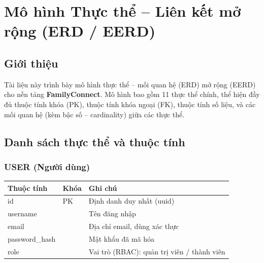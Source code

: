 \section{Mô hình Thực thể -- Liên kết mở rộng (ERD / EERD)}
\label{sec:1_3_mo_hinh_erd_eerd}

\subsection{Giới thiệu}
Tài liệu này trình bày mô hình thực thể -- mối quan hệ (ERD) mở rộng (EERD)
cho nền tảng \textbf{FamilyConnect}. Mô hình bao gồm 11 thực thể chính,
thể hiện đầy đủ thuộc tính khóa (PK), thuộc tính khóa ngoại (FK), thuộc tính
số liệu, và các mối quan hệ (kèm bậc số -- cardinality) giữa các thực thể.

\subsection{Danh sách thực thể và thuộc tính}

\subsubsection{USER (Người dùng)}
\begin{longtable}{@{}p{3cm}p{2cm}p{9.5cm}@{}}
\toprule
\textbf{Thuộc tính} & \textbf{Khóa} & \textbf{Ghi chú} \\
\midrule
id & PK & Định danh duy nhất (uuid) \\
username & & Tên đăng nhập \\
email & & Địa chỉ email, dùng xác thực \\
password\_hash & & Mật khẩu đã mã hóa \\
role & & Vai trò (RBAC): quản trị viên / thành viên \\
\bottomrule
\end{longtable}

